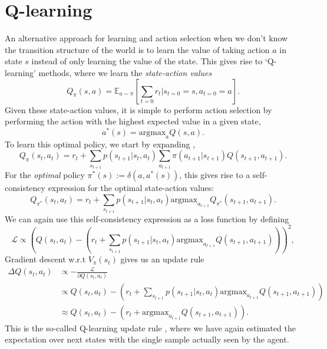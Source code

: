 \section{Q-learning}
\label{sec:q_learning}

An alternative approach for learning and action selection when we don't know the transition structure of the world is to learn the value of taking action $a$ in state $s$ instead of only learning the value of the state.
This gives rise to `Q-learning' methods, where we learn the \emph{state-action values}
\begin{equation}
    \label{eq:Q-values}
    Q_\pi(s,a) =  \mathbb{E}_{a \sim \pi} \left [ \sum_{t=0} r_t | s_{t=0} = s, a_{t=0} = a \right ].
\end{equation}
Given these state-action values, it is simple to perform action selection by performing the action with the highest expected value in a given state,
\begin{equation}
    a^*(s) = \text{argmax}_{a} Q(s, a).
\end{equation}
To learn this optimal policy, we start by expanding ,
\begin{equation}
    \label{eq:Q-expanded}
    Q_\pi(s_t,a_t) =  r_t + \sum_{s_{t+1}} p(s_{t+1} | s_t, a_t) \sum_{a_{t+1}} \pi(a_{t+1} | s_{t+1}) Q(s_{t+1}, a_{t+1}).
\end{equation}
For the \emph{optimal} policy $\pi^*(s) := \delta(a, a^*(s))$, this gives rise to a self-consistency expression for the optimal state-action values:
\begin{equation}
    \label{eq:Q-optimal}
    Q_{\pi^*}(s_t,a_t) =  r_t + \sum_{s_{t+1}} p(s_{t+1} | s_t, a_t) \text{argmax}_{a_{t+1}} Q_{\pi^*}(s_{t+1}, a_{t+1}).
\end{equation}
We can again use this self-consistency expression as a loss function by defining
\begin{equation}
    \mathcal{L} \propto \left (  Q(s_t,a_t) - (r_t + \sum_{s_{t+1}} p(s_{t+1} | s_t, a_t) \text{argmax}_{a_{t+1}} Q(s_{t+1}, a_{t+1})) \right )^2,
\end{equation}
Gradient descent w.r.t $V_\pi(s_t)$ gives us an update rule
\begin{align}
    \Delta  Q(s_t,a_t) & \propto - \frac{\mathcal{L}}{\partial  Q(s_t,a_t)}\\
    &\propto Q(s_t,a_t) - (r_t + \sum_{s_{t+1}} p(s_{t+1} | s_t, a_t) \text{argmax}_{a_{t+1}} Q(s_{t+1}, a_{t+1}))\\
    &\approx Q(s_t,a_t) - (r_t + \text{argmax}_{a_{t+1}} Q(s_{t+1}, a_{t+1})).
\end{align}
This is the so-called Q-learning update rule \citep{watkins1989learning}, where we have again estimated the expectation over next states with the single sample actually seen by the agent.

